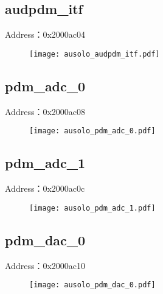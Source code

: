 \subsection{audpdm\_itf}
\label{ausolo-audpdm-itf}
Address：0x2000ac04
 \begin{figure}[H]
\texttt{[image: ausolo\_audpdm\_itf.pdf]}
\end{figure}

\subsection{pdm\_adc\_0}
\label{ausolo-pdm-adc-0}
Address：0x2000ac08
 \begin{figure}[H]
\texttt{[image: ausolo\_pdm\_adc\_0.pdf]}
\end{figure}

\subsection{pdm\_adc\_1}
\label{ausolo-pdm-adc-1}
Address：0x2000ac0c
 \begin{figure}[H]
\texttt{[image: ausolo\_pdm\_adc\_1.pdf]}
\end{figure}

\subsection{pdm\_dac\_0}
\label{ausolo-pdm-dac-0}
Address：0x2000ac10
 \begin{figure}[H]
\texttt{[image: ausolo\_pdm\_dac\_0.pdf]}
\end{figure}

